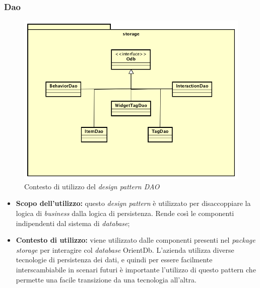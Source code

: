 \subsubsection{Dao}
\begin{figure}[h]
\centering
\includegraphics[scale=0.20]{immagini/storage}
\caption{Contesto di utilizzo del \emph{design pattern DAO}}
\label{fig:pattern-dao}
\end{figure}
\begin{itemize}
\item\textbf{Scopo dell'utilizzo:} questo \emph{design pattern} è utilizzato per disaccoppiare la logica di \emph{business} dalla logica di persistenza. Rende così le componenti indipendenti dal sistema di \emph{database};
\item \textbf{Contesto di utilizzo:} viene utilizzato dalle componenti presenti nel \emph{package storage} per interagire col \emph{database} OrientDb. L'azienda utilizza diverse tecnologie di persistenza dei dati, e quindi per essere facilmente interscambiabile in scenari futuri è importante l'utilizzo di questo pattern che permette una facile transizione da una tecnologia all'altra.
\end{itemize}
